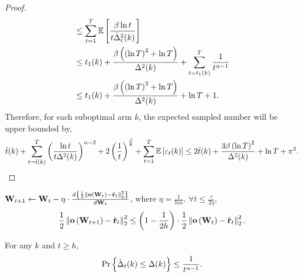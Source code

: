 \begin{proof}
\begin{equation*}
\begin{split}
    &\le \sum\limits_{t=1}^{T}{ \operatorname*{{\mathbb{E}}}{ \left[  \frac{\beta \ln{t}}{t \hat{\Delta}_t^2(k)} \right]} } \\
    &\le t_1(k) + \frac{\beta \left( \left( \ln{T}\right)^2 + \ln{T} \right)}{\Delta^2(k)} + \sum\limits_{t = t_1(k)}^{T}{ \frac{1}{t^{\alpha - 1}} } \\
    &\le t_1(k) + \frac{\beta \left( \left( \ln{T}\right)^2 + \ln{T} \right)}{\Delta^2(k)} + \ln{T} + 1.
\end{split}
\end{equation*}
Therefore, for each suboptimal arm $k$, the expected sampled number will be upper bounded by,
\begin{equation*}
\begin{split}
     \bar{t}(k) + \sum\limits_{t = \bar{t}(k) }^{T}{ \left( \frac{\ln{t}}{t \Delta^2(k)} \right)^{\alpha - 2} + 2 \left(\frac{1}{t}\right)^{\frac{\beta}{8}} } + \sum\limits_{t=1}^{T}{ \operatorname*{{\mathbb{E}}}{ \left[ \varepsilon_t(k) \right]} } \le 2 \bar{t}(k) + \frac{ 3 \beta \left( \ln{T} \right)^2}{\Delta^2(k)} + \ln{T} + \pi^2.
\end{split}
\end{equation*}
\end{proof}

\begin{lem}
\label{lem:logit_l2_loss_parameter_smoothness}
${\mathbf{W}}_{t+1} \leftarrow {\mathbf{W}}_t - \eta \cdot \frac{d \left\{ \frac{1}{2} \left\| {\mathbf{o}}\left( {\mathbf{W}}_t\right) - \hat{{\mathbf{r}}}_t \right\|_2^2 \right\}}{d {\mathbf{W}}_t}$, where $\eta = \frac{1}{h m}$. $\forall t \le \frac{\tau}{2 \eta}$,
\begin{equation*}
\begin{split}
    \frac{1}{2} \left\| {\mathbf{o}}\left( {\mathbf{W}}_{t+1} \right) - \hat{{\mathbf{r}}}_t \right\|_2^2 \le \left( 1 - \frac{1}{2 h} \right) \cdot \frac{1}{2} \left\| {\mathbf{o}}\left( {\mathbf{W}}_t \right) - \hat{{\mathbf{r}}}_t \right\|_2^2.
\end{split}
\end{equation*}
\end{lem}

\begin{lem}
\label{lem:delta_estimation_lower_bound}
For any $k$ and $t \ge h$,
\begin{equation*}
    {\text{Pr}}\left\{ \hat{\Delta}_t(k) \le \Delta(k) \right\} \le \frac{1}{t^{\alpha-1}}.
\end{equation*}
\end{lem}
